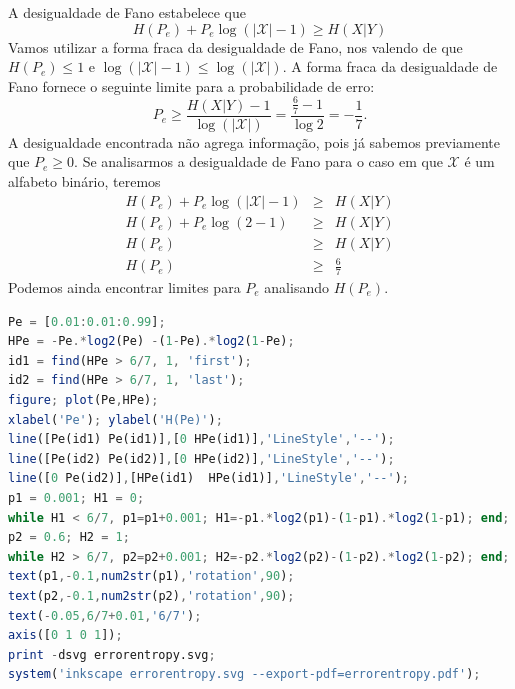 \begin{questions}
\begin{solution}
\begin{parts}
  A desigualdade de Fano estabelece que
  \begin{equation}
  H(P_e) + P_e \log \left( \vert \mathcal{X} \vert - 1 \right) \geq H(X|Y)
  \end{equation}
  Vamos utilizar a forma fraca da desigualdade de Fano, nos valendo de que $H(P_e) \leq 1$ e $\log \left( \vert \mathcal{X} \vert - 1 \right) \leq \log \left( \vert \mathcal{X} \vert \right)$.
  A forma fraca da desigualdade de Fano fornece o seguinte limite para a probabilidade de erro:
  \begin{equation}
  P_e \geq \frac{H(X|Y) - 1}{\log \left( \vert \mathcal{X} \vert \right)} = \frac{\frac{6}{7} - 1}{\log 2} = - \frac{1}{7} .
  \end{equation}
  A desigualdade encontrada não agrega informação, pois já sabemos previamente que $P_e \geq 0$. 
  Se analisarmos a desigualdade de Fano para o caso em que $\mathcal{X}$ é um alfabeto binário, teremos
  \begin{eqnarray}
  H(P_e) + P_e \log \left( \vert \mathcal{X} \vert - 1 \right) &\geq& H(X|Y) \nonumber \\
  H(P_e) + P_e \log \left( 2 - 1 \right) &\geq& H(X|Y) \nonumber \\
  H(P_e) &\geq& H(X|Y) \nonumber \\
  H(P_e) &\geq& \frac{6}{7}
  \end{eqnarray}
  Podemos ainda encontrar limites para $P_e$ analisando $H(P_e)$.

  \begin{lstlisting}[language=Octave]
Pe = [0.01:0.01:0.99];
HPe = -Pe.*log2(Pe) -(1-Pe).*log2(1-Pe);
id1 = find(HPe > 6/7, 1, 'first');
id2 = find(HPe > 6/7, 1, 'last');
figure; plot(Pe,HPe);
xlabel('Pe'); ylabel('H(Pe)');
line([Pe(id1) Pe(id1)],[0 HPe(id1)],'LineStyle','--');
line([Pe(id2) Pe(id2)],[0 HPe(id2)],'LineStyle','--');
line([0 Pe(id2)],[HPe(id1)  HPe(id1)],'LineStyle','--');
p1 = 0.001; H1 = 0;
while H1 < 6/7, p1=p1+0.001; H1=-p1.*log2(p1)-(1-p1).*log2(1-p1); end;
p2 = 0.6; H2 = 1;
while H2 > 6/7, p2=p2+0.001; H2=-p2.*log2(p2)-(1-p2).*log2(1-p2); end;
text(p1,-0.1,num2str(p1),'rotation',90);
text(p2,-0.1,num2str(p2),'rotation',90);
text(-0.05,6/7+0.01,'6/7');
axis([0 1 0 1]);
print -dsvg errorentropy.svg;
system('inkscape errorentropy.svg --export-pdf=errorentropy.pdf');
\end{lstlisting}


\end{parts}
\end{solution}
\end{questions}
